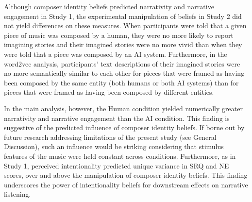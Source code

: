 \documentclass[12pt,twoside]{reedthesis}
\begin{document}
Although composer identity beliefs predicted narrativity and narrative engagement in Study 1, the experimental manipulation of beliefs in Study 2 did not yield differences on these measures. When participants were told that a given piece of music was composed by a human, they were no more likely to report imagining stories and their imagined stories were no more vivid than when they were told that a piece was composed by an AI system. Furthermore, in the word2vec analysis, participants’ text descriptions of their imagined stories were no more semantically similar to each other for pieces that were framed as having been composed by the same entity (both humans or both AI systems) than for pieces that were framed as having been composed by different entities. 

In the main analysis, however, the Human condition yielded numerically greater narrativity and narrative engagement than the AI condition. This finding is suggestive of the predicted influence of composer identity beliefs. If borne out by future research addressing limitations of the present study (see General Discussion), such an influence would be striking considering that stimulus features of the music were held constant across conditions. Furthermore, as in Study 1, perceived intentionality predicted unique variance in SRQ and NE scores, over and above the manipulation of composer identity beliefs. This finding underscores the power of intentionality beliefs for downstream effects on narrative listening. 





  \backmatter %

    \nocite{*}


%  
 

\end{document}
